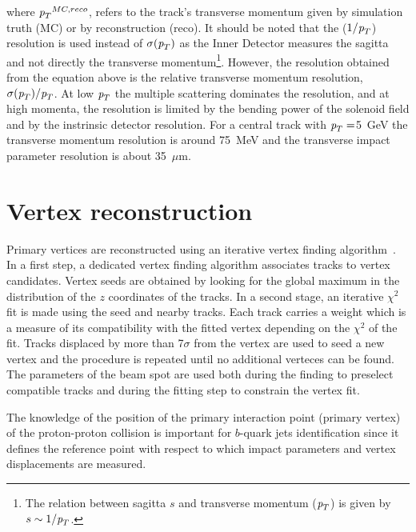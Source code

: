 \begin{itemize}
\begin{itemize}
where ${\emph{p}_{T}}^{MC,reco}$, refers to the track's transverse momentum given by simulation truth (MC) or by reconstruction (reco). It should be noted that the ($1/{\emph{p}_{T}}$) resolution is used instead of $\sigma({\emph{p}_{T}})$ as the Inner Detector measures the sagitta and not directly the transverse momentum\footnote{The relation between sagitta $s$ and transverse momentum (${\emph{p}_{T}}$) is given by $s \sim  1/{\emph{p}_{T}}$. }.  However, the resolution obtained from the equation above is the relative transverse momentum resolution,  $\sigma({\emph{p}_{T}}) / {\emph{p}_{T}}$. At low ${\emph{p}_{T}}$ the multiple scattering dominates the resolution, and at high momenta, the resolution is limited by the bending power of the solenoid field and by the instrinsic detector resolution.  For a central track with ${\emph{p}_{T}}=$5~GeV %
the transverse momentum resolution is around 75~MeV and the transverse impact parameter resolution is about 35~$\mu$m.



\section{Vertex reconstruction}\label{sec:trackreco}

Primary vertices are reconstructed using an iterative vertex finding algorithm~\cite{ATLAS-CONF-2010-069}. In a first step, a dedicated vertex finding algorithm associates tracks to vertex candidates. Vertex seeds are obtained by looking for the global maximum in the distribution of the $z$ coordinates of the tracks. In a second stage, an iterative $\chi^2$ fit is made using the seed and nearby tracks. Each track carries a weight which is a measure of its compatibility with the fitted vertex depending on the $\chi^2$ of the fit. Tracks displaced by more than 7$\sigma$ from the vertex are used to seed a new vertex and the procedure is repeated until no additional verteces can be found.  %
The parameters of the beam spot are used both during the finding to preselect compatible tracks and during the fitting step to constrain the vertex fit.


The knowledge of the position of the primary interaction point (primary vertex) of the proton-proton collision is important for $b$-quark jets identification since it defines the reference point with respect to which impact parameters and vertex displacements are measured. 




\end{itemize}
\end{itemize}
